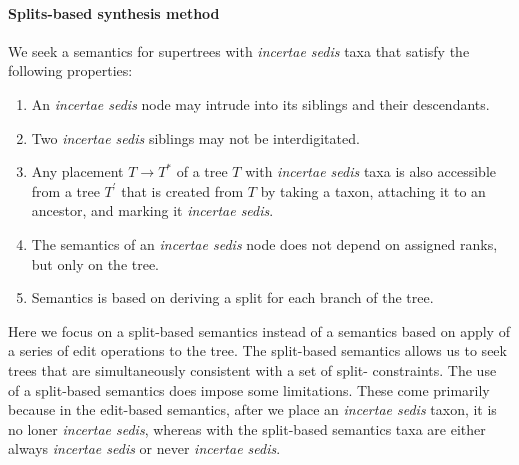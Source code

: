 \documentclass[english]{article}
\begin{document}
\paragraph{Splits-based synthesis method}

 

We seek a semantics for supertrees with \emph{incertae sedis }taxa
that satisfy the following properties:
\begin{enumerate}
    \item An \emph{incertae sedis} node may intrude into its siblings and their
descendants.
    \item Two \emph{incertae sedis} siblings may not be
interdigitated.
    \item Any placement $T\to T^{*}$ of a tree $T$ with
\emph{incertae sedis} taxa is also accessible from a tree $T^{\prime}$
that is created from $T$ by taking a taxon, attaching it to an
ancestor, and marking it \emph{incertae sedis}. 
    \item The semantics of an
\emph{incertae sedis} node does not depend on assigned ranks, but only
on the tree.
    \item Semantics is based on deriving a split for each
branch of the tree.
\end{enumerate}
Here we focus on a split-based
semantics instead of a semantics based on apply of a series of edit
operations to the tree.
The split-based semantics allows us to seek
trees that are simultaneously consistent with a set of split-
constraints.
The use of a split-based semantics does impose some
limitations.
These come primarily because in the edit-based semantics,
after we place an \emph{incertae sedis} taxon, it is no loner
\emph{incertae sedis}, whereas with the split-based semantics taxa are
either always \emph{incertae sedis} or never \emph{incertae sedis}.
\end{document}
